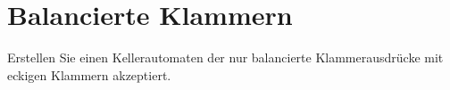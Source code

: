 \documentclass{lehramt-informatik-aufgabe}
\begin{document}
\section{Balancierte Klammern
}


Erstellen Sie einen Kellerautomaten der nur balancierte Klammerausdrücke mit
eckigen Klammern akzeptiert.

\end{document}
